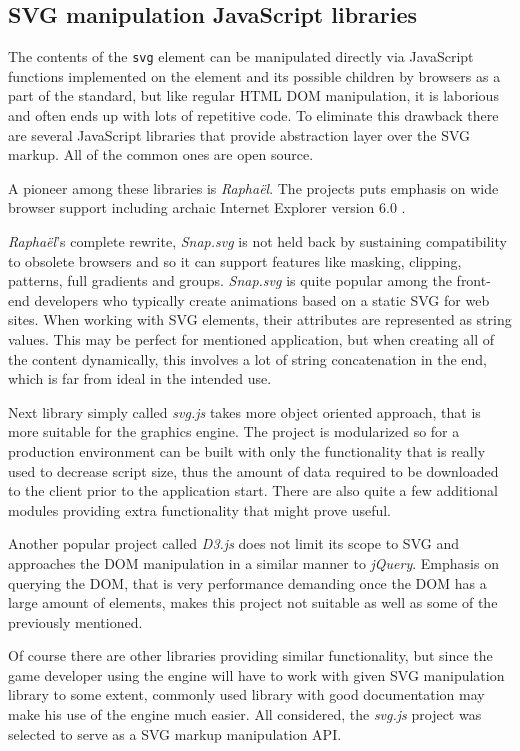 \documentclass[11pt,oneside, final]{fithesis2}
\begin{document}
\subsection{SVG manipulation JavaScript libraries}
The contents of the \texttt{svg} element can be manipulated directly via JavaScript functions implemented on the element and its possible children by browsers as a part of the standard\cite{svgtypes}, but like regular HTML DOM manipulation, it is laborious and often ends up with lots of repetitive code. To eliminate this drawback there are several JavaScript libraries that provide abstraction layer over the SVG markup. All of the common ones are open source.

A pioneer among these libraries is \emph{Raphaël}. The projects puts emphasis on wide browser support including archaic Internet Explorer version 6.0 \cite{raphael}.

\emph{Raphaël}'s complete rewrite, \emph{Snap.svg} is not held back by sustaining compatibility to obsolete browsers and so it can support features like masking, clipping, patterns, full gradients and groups\cite{snap}. \emph{Snap.svg} is quite popular among the front-end developers who typically create animations based on a static SVG for web sites\cite{snapusage}. When working with SVG elements, their attributes are represented as string values. This may be perfect for mentioned application, but when creating all of the content dynamically, this involves a lot of string concatenation in the end, which is far from ideal in the intended use.

Next library simply called \emph{svg.js} takes more object oriented approach\cite{svgjs}, that is more suitable for the graphics engine. The project is modularized so for a production environment can be built with only the functionality that is really used to decrease script size, thus the amount of data required to be downloaded to the client prior to the application start. There are also quite a few additional modules providing extra functionality that might prove useful.

Another popular project called \emph{D3.js} does not limit its scope to SVG and approaches the DOM manipulation in a similar manner to \emph{jQuery}\cite{d3js}. Emphasis on querying the DOM, that is very performance demanding once the DOM has a large amount of elements, makes this project not suitable as well as some of the previously mentioned.

Of course there are other libraries providing similar functionality, but since the game developer using the engine will have to work with given SVG manipulation library to some extent, commonly used library with good documentation may make his use of the engine much easier. All considered, the \emph{svg.js} project was selected to serve as a SVG markup manipulation API.
\end{document}
